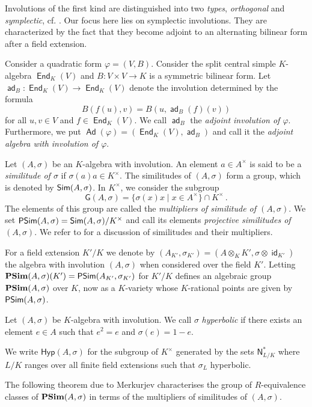 \documentclass[twoside,11pt]{amsart}
\numberwithin{equation}{section}
\theoremstyle{definition}
\newcommand\End{\operatorname{\mathsf{End}}}
\newcommand\id{\operatorname{\mathsf{id}}}
\newcommand\N{\operatorname{N}}
\newcommand{\vf}{\varphi}
\newcommand{\mg}[1]{{#1}^{\times}}
\newcommand{\s}{\sigma}
\newcommand\Ad{\operatorname{\mathsf{Ad}}}
\newcommand\ad{\operatorname{\mathsf{ad}}}
\renewcommand{\N}{\mathsf{N}}
\newcommand{\Sim}{{\bf\mathsf{Sim}}}
\newcommand{\PSim}{{\bf\mathsf{PSim}}}
\newcommand{\G}{\mathsf{G}}
\newcommand{\Hyp}{\mathsf{Hyp}}
\begin{document}
Involutions of the first kind are distinguished into two \emph{types}, \emph{orthogonal} and \emph{symplectic}, cf. \cite[\S 2]{KMRT98}. Our focus here lies on symplectic involutions. They are characterized by the fact that they become adjoint to an alternating bilinear form after a field extension.



Consider a quadratic form $\vf=(V,B)$. Consider the split central simple $K$-algebra
$\End_{K} (V)$ and $B:V\times V\rightarrow K$ is a symmetric bilinear form. Let $\ad_B : \End_{K} (V) \rightarrow \End_{K} (V)$ denote the involution determined by the formula
$$B( f (u), v) = B(u, \ad_B( f )(v))$$ for all $u, v \in V$ and $f \in \End_{K} (V)$.
We call $\ad_B$ the \emph{adjoint involution of $\vf$}. Furthermore, we put $\Ad(\vf)=(\End_K (V), \ad_B)$ and call it the \emph{adjoint algebra with involution of $\vf$}.

 
 
Let $(A, \sigma)$ be an $K$-algebra with involution. An element $a\in \mg{A}$ is said to be a 
{\it similitude of $\s$} if $\sigma(a)a \in \mg{K}$. 
The similitudes of $(A, \sigma)$ form a group, which is denoted by 
$\Sim(A, \sigma)$.
In $\mg{K}$, we consider the subgroup
$$\G(A,\s)=\{\s(x)x\mid x\in\mg{A}\}\cap\mg{K}\,.$$
The elements of this group are called the \emph{multipliers of similitude of $(A,\s)$}.
We set $\PSim(A,\s)=\Sim(A,\s)/\mg{K}$ and call its elements \emph{projective similitudes of $(A,\s)$}.
We refer to \cite[\S12]{KMRT98} for a discussion of similitudes and their multipliers.

For a field extension $K'/K$ we denote by $(A_{K'}, \s_{K'})=(A\otimes_{K}K', \s\otimes\id_{K'})$ the algebra with involution $(A,\s)$ when considered over the field $K'$. 
Letting ${\bf PSim}(A,\s)(K')=\PSim(A_{K'},\s_{K'})$ for $K'/K$ defines an algebraic group ${\bf PSim} (A,\sigma)$ over $K$, now as a $K$-variety whose $K$-rational points are given by $\PSim(A,\s)$.

Let $(A,\s)$ be $K$-algebra with involution.
We call $\s$ \emph{hyperbolic} if there exists an element $e\in A$ such that $e^2=e$ and $\s(e)=1-e$.

We write $\Hyp(A,\s)$ for the subgroup of $\mg{K}$ generated by the sets $\N_{L/K}^\ast$ where $L/K$ ranges over all finite field extensions  such that $\s_L$ hyperbolic.



 The following theorem due to 
Merkurjev characterises the 
group of 
$R$-equiva\-lence classes of 
${\bf PSim} (A, \s)$ in terms of the multipliers 
of similitudes of $(A, \s)$. 
\end{document}
